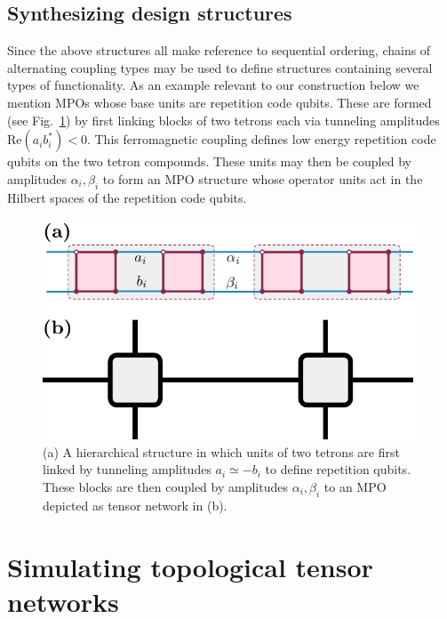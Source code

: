 \documentclass[twocolumn,floats,prx,showpacs]{revtex4-1}
\begin{document}
\subsection{Synthesizing design structures}
\label{sec:SynthDesign}

Since the above structures all make reference to sequential ordering, chains of alternating coupling types may be used to define structures containing several types of functionality. As an example relevant to our construction below we mention MPOs whose base units are repetition code qubits. These are formed  (see Fig.~\ref{fig:RepetitionMPS}) by first  linking blocks of two tetrons each via tunneling amplitudes $\mathrm{Re}(a_ib_i^\ast)<0$. This ferromagnetic coupling defines low energy repetition code qubits on the two tetron compounds. These units may then be coupled by amplitudes $\alpha_i,\beta_i$ to form an MPO structure whose operator units act in the Hilbert spaces of the repetition code qubits.  

\begin{figure}
\includegraphics[width=0.66\columnwidth]{fig/RepetitionMPS.pdf}
\caption{(a) A hierarchical structure in which units of two tetrons are first linked by tunneling amplitudes $a_i\simeq -b_i$ to define repetition qubits. These blocks are then coupled by amplitudes $\alpha_i, \beta_i$ to an MPO depicted as tensor network in (b).}
\label{fig:RepetitionMPS}
\end{figure}



\section{Simulating topological tensor networks}\label{sec4}
\end{document}
